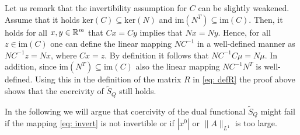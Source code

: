 \documentclass[11pt]{article}
\begin{document}
\begin{remark}
Let us remark that the invertibility assumption for $C$ can be slightly weakened.
Assume that it holds $\text{ker}(C) \subseteq \text{ker}(N)$ and $\text{im}(N^T) \subseteq \text{im}(C)$. Then, it holds for all $x,y \in \mathbb R^m$ that $Cx = Cy$ implies that $Nx = Ny$. Hence, for all $z \in \text{im}(C)$ one can define the linear mapping $NC^{-1}$ in a well-defined manner  as $NC^{-1}z = Nx$, where $Cx = z$. By definition it follows that $N C^{-1} C\mu = N\mu$. In addition, since $\text{im}(N^T) \subseteq \text{im}(C)$ also the linear mapping $NC^{-1} N^T$ is well-defined. Using this in the definition of the matrix $R$ in \eqref{eq: defR} the proof above shows that the coercivity of $\tilde{S}_Q$ still holds. 

\end{remark}

In the following we will argue that coercivity of the dual functional $\tilde{S}_Q$ might fail if the mapping \eqref{eq: invert} is not invertible or if $|x^0|$ or $\|A \|_{L^1}$ is too large.
\end{document}

